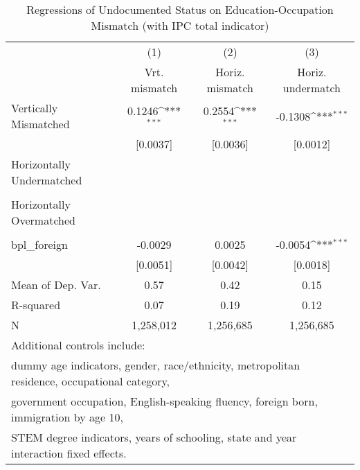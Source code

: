 \begin{table}[htbp]\centering
\def\sym#1{\ifmmode^{#1}\else\(^{#1}\)\fi}
\caption{Regressions of Undocumented Status on Education-Occupation Mismatch (with IPC total indicator)}
\begin{tabular}{l*{3}{c}}
\toprule
                    &\multicolumn{1}{c}{(1)}         &\multicolumn{1}{c}{(2)}         &\multicolumn{1}{c}{(3)}         \\
                    &Vrt. mismatch         &Horiz. mismatch         &Horiz. undermatch         \\
\midrule
Vertically Mismatched&      0.1246\sym{***}&      0.2554\sym{***}&     -0.1308\sym{***}\\
                    &    [0.0037]         &    [0.0036]         &    [0.0012]         \\
\addlinespace
Horizontally Undermatched&                     &                     &                     \\
                    &                     &                     &                     \\
\addlinespace
Horizontally Overmatched&                     &                     &                     \\
                    &                     &                     &                     \\
\addlinespace
bpl\_foreign         &     -0.0029         &      0.0025         &     -0.0054\sym{***}\\
                    &    [0.0051]         &    [0.0042]         &    [0.0018]         \\
\midrule
Mean of Dep. Var.   &        0.57         &        0.42         &        0.15         \\
R-squared           &        0.07         &        0.19         &        0.12         \\
N                   &   1,258,012         &   1,256,685         &   1,256,685         \\
\bottomrule
\multicolumn{4}{l}{\footnotesize Additional controls include:}\\
\multicolumn{4}{l}{\footnotesize dummy age indicators, gender, race/ethnicity, metropolitan residence, occupational category,}\\
\multicolumn{4}{l}{\footnotesize government occupation, English-speaking fluency, foreign born, immigration by age 10,}\\
\multicolumn{4}{l}{\footnotesize STEM degree indicators, years of schooling, state and year interaction fixed effects.}\\

\end{tabular}
\end{table}
